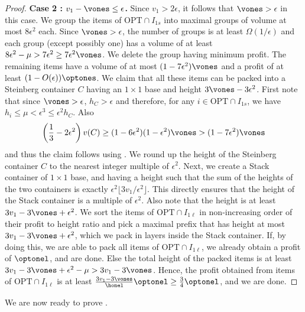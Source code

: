 \begin{proof}
    \textbf{Case 2 : $v_1 - \vones \le \epsilon$.} Since $v_1 > 2\epsilon$, it follows that $\vones > \epsilon$ in this case. We group the items of $\text{OPT}\cap I_{1s}$ into maximal groups of volume at most $8\epsilon^2$ each. Since $\vones > \epsilon$, the number of groups is at least $\Omega(1/\epsilon)$ and each group (except possibly one) has a volume of at least $8\epsilon^2-\mu>7\epsilon^2\ge 7\epsilon^2 \vones$. We delete the group having minimum profit. The remaining items have a volume of at most $(1-7\epsilon^2)\vones$ and a profit of at least $(1-O(\epsilon))\optones$. We claim that all these items can be packed into a Steinberg container $C$ having an $1\times 1$ base and height $3\vones-3\epsilon^2$. First note that since $\vones >\epsilon$, $h_C >\epsilon$ and therefore, for any $i\in \text{OPT}\cap I_{1s}$, we have $h_i \le \mu < \epsilon^3 \le \epsilon^2 h_C$. Also
    \[ \left(\frac{1}{3}-2\epsilon^2\right)v(C) \ge (1-6\epsilon^2)(1-\epsilon^2)\vones > (1-7\epsilon^2)\vones\]
    and thus the claim follows using . We round up the height of the Steinberg container $C$ to the nearest integer multiple of $\epsilon^2$. Next, we create a Stack container of $1\times 1$ base, and having a height such that the sum of the heights of the two containers is exactly $\epsilon^2\lfloor 3v_1/\epsilon^2\rfloor$. This directly ensures that the height of the Stack container is a multiple of $\epsilon^2$. Also note that the height is at least $3v_1-3\vones + \epsilon^2$. We sort the items of $\text{OPT}\cap I_{1\ell}$ in non-increasing order of their profit to height ratio and pick a maximal prefix that has height at most $3v_1-3\vones+\epsilon^2$, which we pack in layers inside the Stack container. If, by doing this, we are able to pack all items of $\text{OPT}\cap I_{1\ell}$, we already obtain a profit of $\optonel$, and are done. Else the total height of the packed items is at least $3v_1-3\vones+\epsilon^2-\mu > 3v_1-3\vones$. Hence, the profit obtained from items of $\text{OPT}\cap I_{1\ell}$ is at least $\frac{3v_1-3\vones}{\honel}\optonel \ge \frac{3}{4}\optonel$, and we are done.
\end{proof}

We are now ready to prove .

